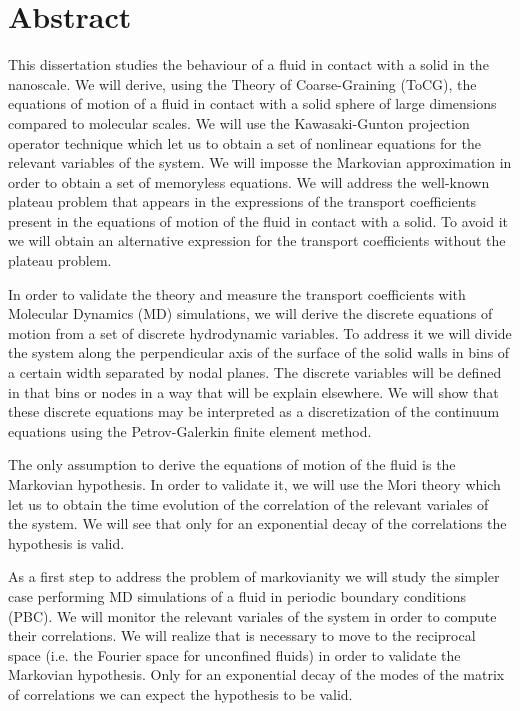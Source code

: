 \documentclass[b5paper,openright,10pt]{book}
\begin{document}
\chapter*{Abstract} %
\pagestyle{noHeader}  %
This dissertation studies the behaviour of a fluid in contact with a solid in the nanoscale. We will derive, using the Theory of Coarse-Graining (ToCG), the equations of motion of a fluid in contact with a solid sphere of large dimensions compared to molecular scales. 
We will use the Kawasaki-Gunton projection operator technique which let us to obtain a set of nonlinear equations for the relevant variables of the system. We will imposse the Markovian approximation in order to obtain a set of memoryless equations.
We will address the well-known plateau problem  that appears in the expressions of the transport coefficients present in the equations of motion of the fluid in contact with a solid. To avoid it we will obtain an alternative expression for the transport coefficients without the plateau problem. 

In order to validate the theory and measure the transport coefficients with Molecular Dynamics (MD) simulations, we will derive the discrete equations of motion from a set of discrete hydrodynamic variables. To address it we will divide the system along the perpendicular axis of the surface of the solid walls in bins of a certain width separated by nodal planes. The discrete variables will be defined in that bins or nodes in a way that will be explain elsewhere.
We will show that these discrete equations may be interpreted as a discretization of the continuum equations using the Petrov-Galerkin finite element method.  

The only assumption to derive the equations of motion of the fluid is the Markovian hypothesis. In order to validate it, we will use the Mori theory which let us to obtain the time evolution of the correlation of the relevant variales of the system. 
We will see that only for an exponential decay of the correlations the hypothesis is valid. 

As a first step to address the problem of markovianity we will study the simpler case performing MD simulations of a fluid in periodic boundary conditions (PBC). We will monitor the relevant variales of the system in order to compute their correlations. 
We will realize that is necessary to move to the reciprocal space (i.e. the Fourier space for unconfined fluids) in order to validate the Markovian hypothesis. Only for an exponential decay of the modes of the matrix of correlations we can expect the hypothesis to be valid. 
\end{document}
